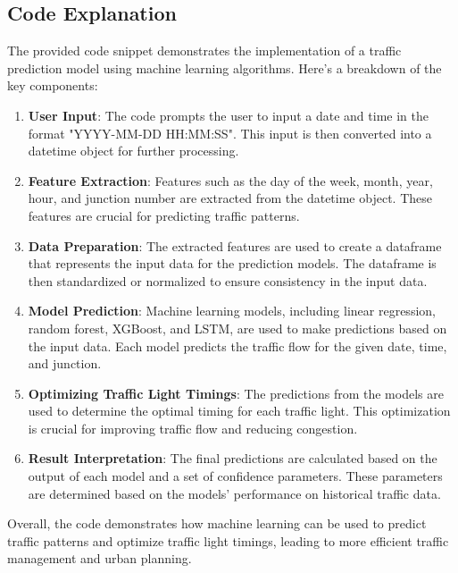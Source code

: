 \documentclass{IEEEtran}
\begin{document}
\subsection{Code Explanation}

The provided code snippet demonstrates the implementation of a traffic prediction model using machine learning algorithms. Here's a breakdown of the key components:

\begin{enumerate}
    \item \textbf{User Input}: The code prompts the user to input a date and time in the format "YYYY-MM-DD HH:MM:SS". This input is then converted into a datetime object for further processing.
    
    \item \textbf{Feature Extraction}: Features such as the day of the week, month, year, hour, and junction number are extracted from the datetime object. These features are crucial for predicting traffic patterns.
    
    \item \textbf{Data Preparation}: The extracted features are used to create a dataframe that represents the input data for the prediction models. The dataframe is then standardized or normalized to ensure consistency in the input data.
    
    \item \textbf{Model Prediction}: Machine learning models, including linear regression, random forest, XGBoost, and LSTM, are used to make predictions based on the input data. Each model predicts the traffic flow for the given date, time, and junction.
    
    \item \textbf{Optimizing Traffic Light Timings}: The predictions from the models are used to determine the optimal timing for each traffic light. This optimization is crucial for improving traffic flow and reducing congestion.
    
    \item \textbf{Result Interpretation}: The final predictions are calculated based on the output of each model and a set of confidence parameters. These parameters are determined based on the models' performance on historical traffic data.
\end{enumerate}

Overall, the code demonstrates how machine learning can be used to predict traffic patterns and optimize traffic light timings, leading to more efficient traffic management and urban planning.
\end{document}
